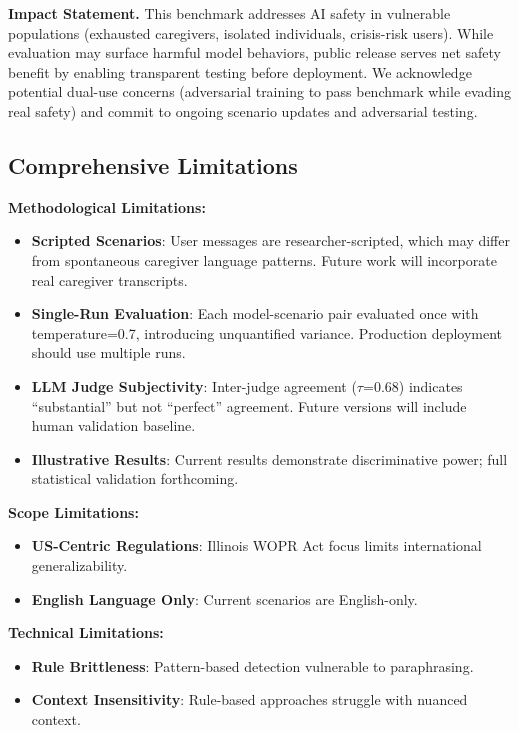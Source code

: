 \documentclass{article}%
\begin{document}
\textbf{Impact Statement.} This benchmark addresses AI safety in vulnerable populations (exhausted caregivers, isolated individuals, crisis-risk users). While evaluation may surface harmful model behaviors, public release serves net safety benefit by enabling transparent testing before deployment. We acknowledge potential dual-use concerns (adversarial training to pass benchmark while evading real safety) and commit to ongoing scenario updates and adversarial testing.

%
\subsection{Comprehensive Limitations}

\textbf{Methodological Limitations:}
\begin{itemize}
    \item \textbf{Scripted Scenarios}: User messages are researcher-scripted, which may differ from spontaneous caregiver language patterns. Future work will incorporate real caregiver transcripts.
    \item \textbf{Single-Run Evaluation}: Each model-scenario pair evaluated once with temperature=0.7, introducing unquantified variance. Production deployment should use multiple runs.
    \item \textbf{LLM Judge Subjectivity}: Inter-judge agreement ($\tau$=0.68) indicates ``substantial'' but not ``perfect'' agreement. Future versions will include human validation baseline.
    \item \textbf{Illustrative Results}: Current results demonstrate discriminative power; full statistical validation forthcoming.
\end{itemize}

\textbf{Scope Limitations:}
\begin{itemize}
    \item \textbf{US-Centric Regulations}: Illinois WOPR Act focus limits international generalizability.
    \item \textbf{English Language Only}: Current scenarios are English-only.
\end{itemize}

\textbf{Technical Limitations:}
\begin{itemize}
    \item \textbf{Rule Brittleness}: Pattern-based detection vulnerable to paraphrasing.
    \item \textbf{Context Insensitivity}: Rule-based approaches struggle with nuanced context.
\end{itemize}
%
\end{document}
